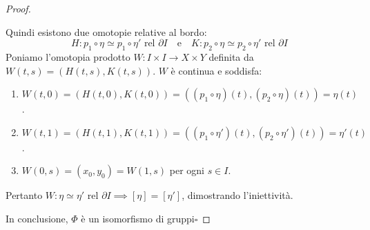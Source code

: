 \begin{proof}
\begin{itemize}
    Quindi esistono due omotopie relative al bordo:
    \[
    H: p_1 \circ \eta \simeq p_1 \circ \eta' \text{ rel } \partial I \quad \text{e} \quad K: p_2 \circ \eta \simeq p_2 \circ \eta' \text{ rel } \partial I
    \]
    Poniamo l'omotopia prodotto $W: I \times I \to X \times Y$ definita da $W(t,s) = (H(t,s), K(t,s))$.
    $W$ è continua e soddisfa:
    \begin{enumerate}[label=\roman*)]
        \item $W(t,0) = (H(t,0), K(t,0)) = ((p_1 \circ \eta)(t), (p_2 \circ \eta)(t)) = \eta(t)$.
        \item $W(t,1) = (H(t,1), K(t,1)) = ((p_1 \circ \eta')(t), (p_2 \circ \eta')(t)) = \eta'(t)$.
        \item $W(0,s) = (x_0, y_0) = W(1,s)$ per ogni $s \in I$.
    \end{enumerate}
    Pertanto $W: \eta \simeq \eta' \text{ rel } \partial I \implies [\eta] = [\eta']$, dimostrando l'iniettività.
\end{itemize}
In conclusione, $\Phi$ è un isomorfismo di gruppi\hfill$\square$
\end{proof}

\vspace{1.5em}


